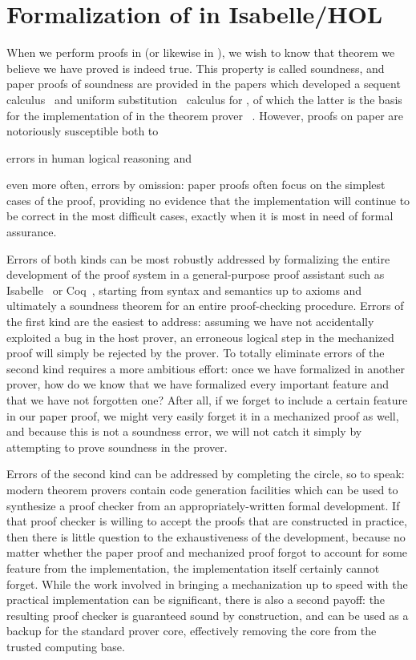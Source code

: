 \documentclass[12pt]{cmuthesis}
\theoremstyle{definition}
\theoremstyle{remark}
\newcommand{\Isabelle}{Isabelle/HOL\xspace}
\begin{document}
\section{Formalization of \dL in \Isabelle}
\label{sec:isabelle-fml}
When we perform proofs in \dL (or likewise in \dGL), we wish to know that theorem we believe we have proved is indeed true.
This property is called soundness, and paper proofs of soundness are provided in the papers which developed a sequent calculus~\cite{DBLP:journals/jar/Platzer08} and uniform substitution~\cite{DBLP:journals/jar/Platzer17} calculus for \dL, of which the latter is the basis for the implementation of \dL in the theorem prover \KeYmaeraX~\cite{DBLP:conf/cade/FultonMQVP15}.
However, proofs on paper are notoriously susceptible both to
\begin{inparaenum}
  \item errors in human logical reasoning and
  \item even more often, errors by omission: paper proofs often focus on the simplest cases of the proof, providing no evidence that the implementation will continue to be correct in the most difficult cases, exactly when it is most in need of formal assurance.
\end{inparaenum}
Errors of both kinds can be most robustly addressed by formalizing the entire development of the proof system in a general-purpose proof assistant such as Isabelle~\cite{ISABELLE} or Coq~\cite{COQ}, starting from syntax and semantics up to axioms and ultimately a soundness theorem for an entire proof-checking procedure.
Errors of the first kind are the easiest to address: assuming we have not accidentally exploited a bug in the host prover, an erroneous logical step in the mechanized proof will simply be rejected by the prover.
To totally eliminate errors of the second kind requires a more ambitious effort: once we have formalized \dL in another prover, how do we know that we have formalized every important feature and that we have not forgotten one?
After all, if we forget to include a certain feature in our paper proof, we might very easily forget it in a mechanized proof as well, and because this is not a soundness error, we will not catch it simply by attempting to prove soundness in the prover.

Errors of the second kind can be addressed by completing the circle, so to speak: modern theorem provers contain code generation facilities which can be used to synthesize a proof checker from an appropriately-written formal development.
If that proof checker is willing to accept the \dL proofs that are constructed in practice, then there is little question to the exhaustiveness of the development, because no matter whether the paper proof and mechanized proof forgot to account for some feature from the implementation, the implementation itself certainly cannot forget.
While the work involved in bringing a mechanization up to speed with the practical implementation can be significant, there is also a second payoff: the resulting proof checker is guaranteed sound by construction, and can be used as a backup for the standard \KeYmaeraX prover core, effectively removing the core from the trusted computing base.
\end{document}
